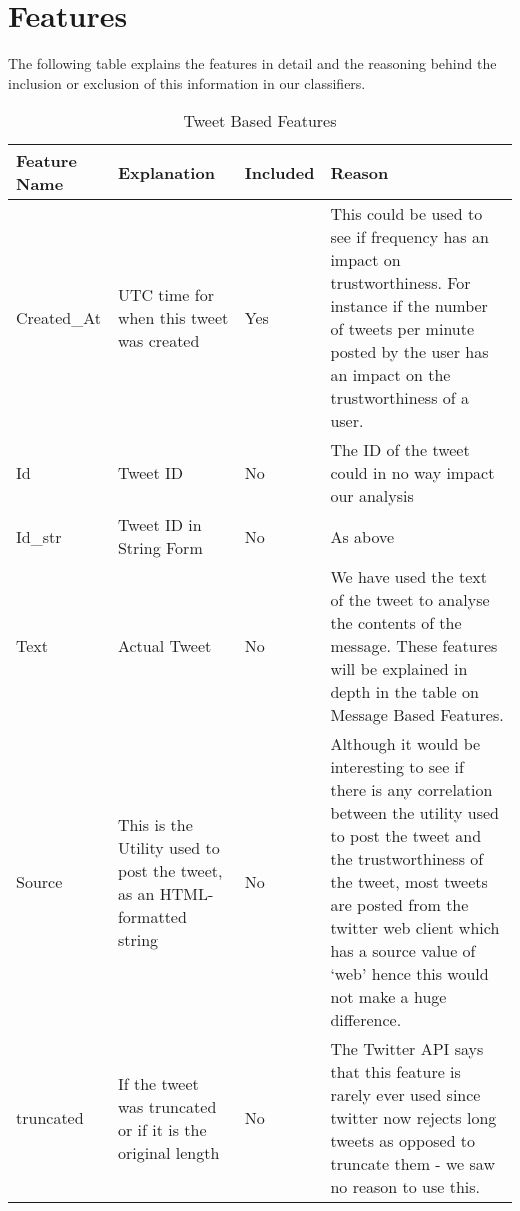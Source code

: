\section{Features}
The following table explains the features in detail and the reasoning behind the inclusion or exclusion of this information in our classifiers. 
\newpage
\begin{landscape}
\centering
\begin{longtable}{|C{1.00in}|C{2.50in}|C{.60in}|C{5.00in}|}
\caption{Tweet Based Features} \\
\toprule[1.5pt]
Feature Name & Explanation & Included & Reason \\\midrule
Created\_At & UTC time for when this tweet was created & Yes & This could be used to see if frequency has an impact on trustworthiness. For instance if the number of tweets per minute posted by the user has an impact on the trustworthiness of a user. \\
\hline
Id & Tweet ID & No  & The ID of the tweet could in no way impact our analysis \\                                                                                                                                                                                                                            
\hline
Id\_str & Tweet ID in String Form & No  & As above \\                                                                                                                                                                                                                                                                            
\hline
Text & Actual Tweet  & No  & We have used the text of the tweet to analyse the contents of the message. These features will be explained in depth in the table on Message Based Features. \\
\hline
Source & This is the Utility used to post the tweet, as an HTML-formatted string & No  & Although it would be interesting to see if there is any correlation between the utility used to post the tweet and the trustworthiness of the tweet, most tweets are posted from the twitter web client which has a source value of `web' hence this would not make a huge difference. \\ 
\hline
truncated & If the tweet was truncated or if it is the original length & No  & The Twitter API says that this feature is rarely ever used since twitter now rejects long tweets as opposed to truncate them - we saw no reason to use this. \\

\end{longtable}
\end{landscape}
